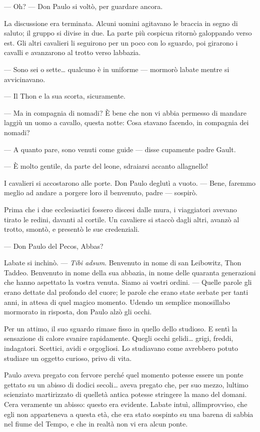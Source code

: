 --- Oh? --- Don Paulo si voltò, per guardare ancora.

La discussione era terminata. Alcuni uomini agitavano le braccia in
segno di saluto; il gruppo si divise in due. La parte più cospicua
ritornò galoppando verso est. Gli altri cavalieri li seguirono per un
poco con lo sguardo, poi girarono i cavalli e avanzarono al trotto verso
l\textquotesingle abbazia.

--- Sono sei o sette\ldots{} qualcuno è in uniforme --- mormorò
l\textquotesingle abate mentre si avvicinavano.

--- Il Thon e la sua scorta, sicuramente.

--- Ma in compagnia di nomadi? È bene che non vi abbia permesso di
mandare laggiù un uomo a cavallo, questa notte: Cosa stavano facendo, in
compagnia dei nomadi?

--- A quanto pare, sono venuti come guide --- disse cupamente padre
Gault.

--- È molto gentile, da parte del leone, sdraiarsi accanto
all\textquotesingle agnello!

I cavalieri si accostarono alle porte. Don Paulo deglutì a vuoto. ---
Bene, faremmo meglio ad andare a porgere loro il benvenuto, padre ---
sospirò.

Prima che i due ecclesiastici fossero discesi dalle mura, i viaggiatori
avevano tirato le redini, davanti al cortile. Un cavaliere si staccò
dagli altri, avanzò al trotto, smontò, e presentò le sue credenziali.

--- Don Paulo del Pecos, Abbas?

L\textquotesingle abate si inchinò. --- \emph{Tibi adsum}. Benvenuto in
nome di san Leibowitz, Thon Taddeo. Benvenuto in nome della sua abbazia,
in nome delle quaranta generazioni che hanno aspettato la vostra venuta.
Siamo ai vostri ordini. --- Quelle parole gli erano dettate dal profondo
del cuore; le parole che erano state serbate per tanti anni, in attesa
di quel magico momento. Udendo un semplice monosillabo mormorato in
risposta, don Paulo alzò gli occhi.

Per un attimo, il suo sguardo rimase fisso in quello dello studioso. E
sentì la sensazione di calore svanire rapidamente. Quegli occhi
gelidi\ldots{} grigi, freddi, indagatori. Scettici, avidi e orgogliosi.
Lo studiavano come avrebbero potuto studiare un oggetto curioso, privo
di vita.

Paulo aveva pregato con fervore perché quel momento potesse essere un
ponte gettato su un abisso di dodici secoli\ldots{} aveva pregato che,
per suo mezzo, l\textquotesingle ultimo scienziato martirizzato di
quell\textquotesingle età antica potesse stringere la mano del domani.
C\textquotesingle era veramente un abisso: questo era evidente.
L\textquotesingle abate intuì, all\textquotesingle improvviso, che egli
non apparteneva a questa età, che era stato sospinto su una barena di
sabbia nel fiume del Tempo, e che in realtà non vi era alcun ponte.

